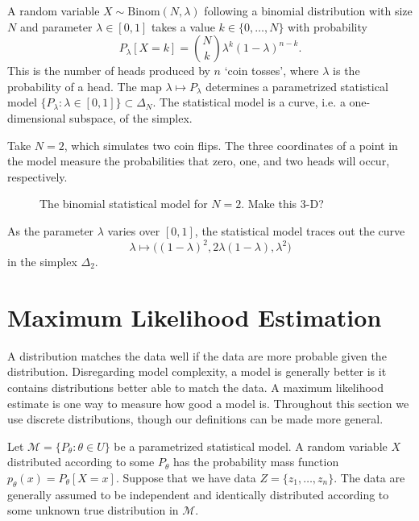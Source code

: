 \documentclass[cclicense]{hmcthesis}
\newcommand*{\Mod}{\mathcal{M}}
\numberwithin{equation}{chapter}
\numberwithin{thmcounter}{chapter}
\begin{document}
    \begin{example}
    A random variable $X \sim \mathrm{Binom}(N, \lambda)$ following a binomial
    distribution with size $N$ and parameter $\lambda \in [0,1]$ takes a value
    $k \in \{0,\ldots, N\}$ with probability
    \[
        P_\lambda[X = k] = {N \choose k} \lambda^k(1-\lambda)^{n-k}.
    \]
    This is the number of heads produced by $n$ `coin tosses', where $\lambda$
    is the probability of a head.  The map $\lambda \mapsto P_\lambda$
    determines a parametrized statistical model $\{P_\lambda : \lambda \in [0,1]
    \} \subset \Delta_N$. The statistical model is a curve, i.e. a
    one-dimensional subspace, of the simplex.  

    Take $N=2$, which simulates two coin flips.  The three coordinates of a
    point in the model measure the probabilities that zero, one, and two heads
    will occur, respectively.
    \begin{figure}[H]\label{fig:binomial}
        \centering
        \vspace*{-0.2cm}
        \vspace*{-0.5cm}
        \caption{The binomial statistical model for $N=2$. Make this 3-D?}
    \end{figure}
    \noindent As the parameter $\lambda$ varies over $[0,1]$, the statistical
    model traces out the curve 
    \[
        \lambda \longmapsto \big((1-\lambda)^2, 2\lambda(1-\lambda), \lambda^2\big)
    \]
    in the simplex $\Delta_2$.  
    \end{example}
    
\section{Maximum Likelihood Estimation}

    A distribution matches the data well if the data are more probable given the
    distribution.  Disregarding model complexity, a model is generally better is
    it contains distributions better able to match the data.  A maximum
    likelihood estimate is one way to measure how good a model is.  Throughout
    this section we use discrete distributions, though our definitions can be
    made more general.

    Let $\Mod = \{P_\theta : \theta \in U\}$ be a parametrized statistical
    model. A random variable $X$ distributed according to some $P_\theta$ has
    the probability mass function $p_\theta(x) = P_\theta[X = x]$.  Suppose that
    we have data $Z = \{z_1, \ldots, z_n\}$.  The data are generally assumed to
    be independent and identically distributed according to some unknown true
    distribution in $\Mod$.
    
\end{document}
